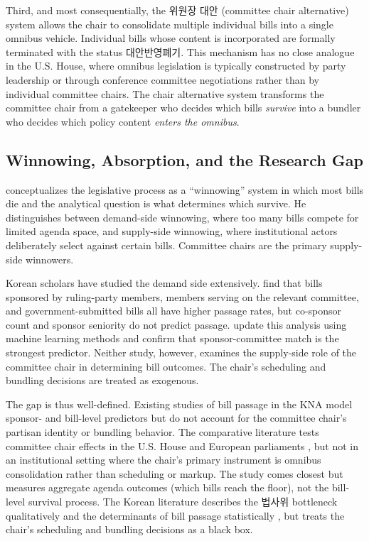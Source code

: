 \documentclass[11pt]{article}
\begin{document}
Third, and most consequentially, the 위원장 대안 (committee chair alternative) system allows the chair to consolidate multiple individual bills into a single omnibus vehicle. Individual bills whose content is incorporated are formally terminated with the status 대안반영폐기. This mechanism has no close analogue in the U.S. House, where omnibus legislation is typically constructed by party leadership or through conference committee negotiations rather than by individual committee chairs. The chair alternative system transforms the committee chair from a gatekeeper who decides which bills \textit{survive} into a bundler who decides which policy content \textit{enters the omnibus}.

\subsection{Winnowing, Absorption, and the Research Gap}

\citet{krutz2005} conceptualizes the legislative process as a ``winnowing'' system in which most bills die and the analytical question is what determines which survive. He distinguishes between demand-side winnowing, where too many bills compete for limited agenda space, and supply-side winnowing, where institutional actors deliberately select against certain bills. Committee chairs are the primary supply-side winnowers.

Korean scholars have studied the demand side extensively. \citet{parkshin2019} find that bills sponsored by ruling-party members, members serving on the relevant committee, and government-submitted bills all have higher passage rates, but co-sponsor count and sponsor seniority do not predict passage. \citet{anparklee2025} update this analysis using machine learning methods and confirm that sponsor-committee match is the strongest predictor. Neither study, however, examines the supply-side role of the committee chair in determining bill outcomes. The chair's scheduling and bundling decisions are treated as exogenous.

The gap is thus well-defined. Existing studies of bill passage in the KNA model sponsor- and bill-level predictors but do not account for the committee chair's partisan identity or bundling behavior. The comparative literature tests committee chair effects in the U.S. House \citep{cox2005, napolio2021} and European parliaments \citep{fortunato2017, konig2022}, but not in an institutional setting where the chair's primary instrument is omnibus consolidation rather than scheduling or markup. The \citet{napolio2021} study comes closest but measures aggregate agenda outcomes (which bills reach the floor), not the bill-level survival process. The Korean literature describes the 법사위 bottleneck qualitatively \citep{ko2017} and the determinants of bill passage statistically \citep{parkshin2019, anparklee2025}, but treats the chair's scheduling and bundling decisions as a black box.
\end{document}
